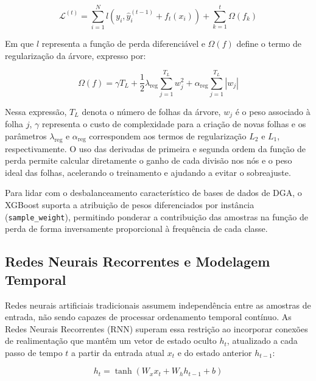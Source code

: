 \begin{equation}\label{eq:xgboost_obj}
\mathcal{L}^{(t)} = \sum_{i=1}^{N} l\left(y_i, \hat{y}_i^{(t-1)} + f_t(x_i)\right) + \sum_{k=1}^{t} \Omega(f_k)
\end{equation}

Em que $l$ representa a função de perda diferenciável e $\Omega(f)$ define o termo de regularização da árvore, expresso por:

\begin{equation}\label{eq:xgboost_omega}
\Omega(f) = \gamma T_L + \frac{1}{2} \lambda_{\text{reg}} \sum_{j=1}^{T_L} w_j^2 + \alpha_{\text{reg}} \sum_{j=1}^{T_L} |w_j|
\end{equation}

Nessa expressão, $T_L$ denota o número de folhas da árvore, $w_j$ é o peso associado à folha $j$, $\gamma$ representa o custo de complexidade para a criação de novas folhas e os parâmetros $\lambda_{\text{reg}}$ e $\alpha_{\text{reg}}$ correspondem aos termos de regularização $L_2$ e $L_1$, respectivamente. O uso das derivadas de primeira e segunda ordem da função de perda permite calcular diretamente o ganho de cada divisão nos nós e o peso ideal das folhas, acelerando o treinamento e ajudando a evitar o sobreajuste.

Para lidar com o desbalanceamento característico de bases de dados de DGA, o XGBoost suporta a atribuição de pesos diferenciados por instância (\texttt{sample\_weight}), permitindo ponderar a contribuição das amostras na função de perda de forma inversamente proporcional à frequência de cada classe.

\subsection{Redes Neurais Recorrentes e Modelagem Temporal}\label{sec:redes_lstm}

Redes neurais artificiais tradicionais assumem independência entre as amostras de entrada, não sendo capazes de processar ordenamento temporal contínuo. As Redes Neurais Recorrentes (RNN) superam essa restrição ao incorporar conexões de realimentação que mantêm um vetor de estado oculto $h_t$, atualizado a cada passo de tempo $t$ a partir da entrada atual $x_t$ e do estado anterior $h_{t-1}$:

\begin{equation}\label{eq:rnn_basica}
h_t = \tanh\left(W_x x_t + W_h h_{t-1} + b\right)
\end{equation}

